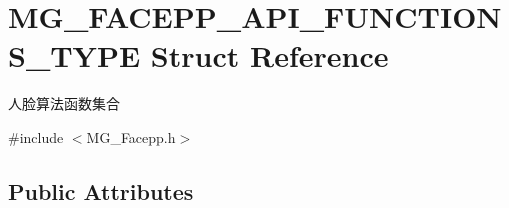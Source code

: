 \hypertarget{struct_m_g___f_a_c_e_p_p___a_p_i___f_u_n_c_t_i_o_n_s___t_y_p_e}{}\section{M\+G\+\_\+\+F\+A\+C\+E\+P\+P\+\_\+\+A\+P\+I\+\_\+\+F\+U\+N\+C\+T\+I\+O\+N\+S\+\_\+\+T\+Y\+PE Struct Reference}
\label{struct_m_g___f_a_c_e_p_p___a_p_i___f_u_n_c_t_i_o_n_s___t_y_p_e}


人脸算法函数集合  




{\ttfamily \#include $<$M\+G\+\_\+\+Facepp.\+h$>$}

\subsection*{Public Attributes}
